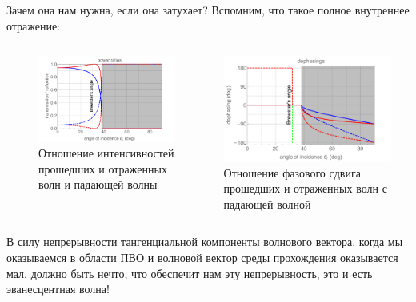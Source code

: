 \documentclass[9pt, compress, xcolor=table]{beamer}
\begin{document}
\begin{frame}{Зачем она нам нужна, если она затухает?}
Вспомним, что такое полное внутреннее отражение:

\begin{columns}[c]
\column{6.5cm}
\begin{center}
\begin{figure}
\centering
\includegraphics[width=0.9 \textwidth]{fc_p}
\\\scriptsize{Отношение интенсивностей прошедших и отраженных волн и падающей волны}
\end{figure}
\end{center}
 
 \column{6.5cm}
\begin{center}
\includegraphics[width=0.9\textwidth]{fc_d}
\\\scriptsize{Отношение фазового сдвига прошедших и отраженных волн с падающей волной}
\end{center}
\end{columns}

В силу непрерывности тангенциальной компоненты волнового вектора, когда мы оказываемся в области ПВО и волновой вектор среды прохождения оказывается мал, должно быть нечто, что обеспечит нам эту непрерывность, это и есть эванесцентная волна!


\end{frame}
\end{document}
